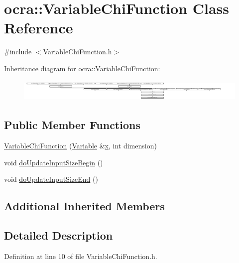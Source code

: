 \hypertarget{classocra_1_1VariableChiFunction}{}\section{ocra\+:\+:Variable\+Chi\+Function Class Reference}
\label{classocra_1_1VariableChiFunction}


{\ttfamily \#include $<$Variable\+Chi\+Function.\+h$>$}

Inheritance diagram for ocra\+:\+:Variable\+Chi\+Function\+:\begin{figure}[H]
\begin{center}
\leavevmode
\includegraphics[height=1.082126cm]{d7/d46/classocra_1_1VariableChiFunction}
\end{center}
\end{figure}
\subsection*{Public Member Functions}
\begin{DoxyCompactItemize}
\item 
\hyperlink{classocra_1_1VariableChiFunction_ac83eecf18f118396efdb5513923eeba6}{Variable\+Chi\+Function} (\hyperlink{classocra_1_1Variable}{Variable} \&\hyperlink{classocra_1_1Function_a28825886d1f149c87b112ec2ec1dd486}{x}, int dimension)
\item 
void \hyperlink{classocra_1_1VariableChiFunction_ad58b8fbb68e8cb27aab585f40875918f}{do\+Update\+Input\+Size\+Begin} ()
\item 
void \hyperlink{classocra_1_1VariableChiFunction_adbc1bb06d86e8ef65e8cdeb55db15353}{do\+Update\+Input\+Size\+End} ()
\end{DoxyCompactItemize}
\subsection*{Additional Inherited Members}


\subsection{Detailed Description}


Definition at line 10 of file Variable\+Chi\+Function.\+h.



